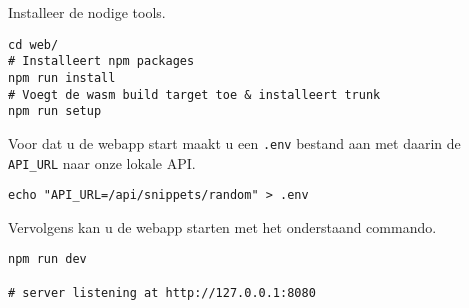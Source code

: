 Installeer de nodige tools.
\begin{verbatim}
cd web/
# Installeert npm packages
npm run install
# Voegt de wasm build target toe & installeert trunk
npm run setup
\end{verbatim}

Voor dat u de webapp start maakt u een \texttt{.env} bestand aan met daarin de
\texttt{API_URL} naar onze lokale API.
\begin{verbatim}
echo "API_URL=/api/snippets/random" > .env
\end{verbatim}

Vervolgens kan u de webapp starten met het onderstaand commando.
\begin{verbatim}
npm run dev

# server listening at http://127.0.0.1:8080
\end{verbatim}
